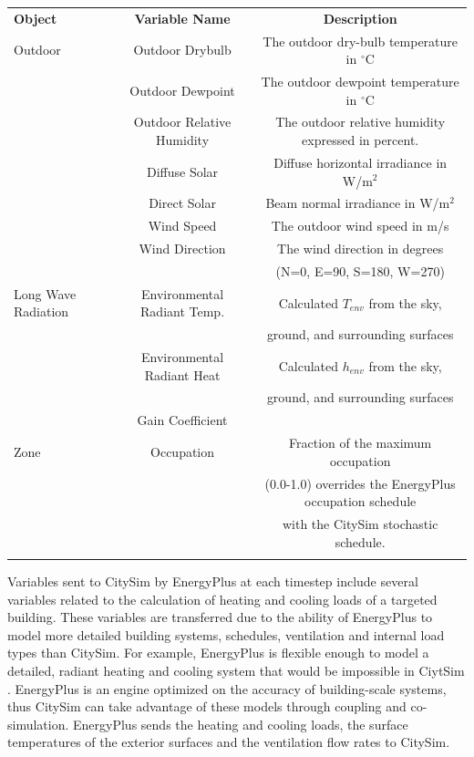 \documentclass{tBPS2e}
\theoremstyle{plain}
\theoremstyle{definition}
\theoremstyle{remark}
\begin{document}
\begin{table}[H]
{\begin{tabular}[l]{@{}lcc}\toprule
  \bf{Object} &  \bf{Variable Name} & \bf{Description} \\
\colrule
  Outdoor & Outdoor Drybulb & The outdoor dry-bulb temperature in $^{\circ}\mathrm{C}$ \\
 & Outdoor Dewpoint & The outdoor dewpoint temperature in $^{\circ}\mathrm{C}$ \\
 & Outdoor Relative Humidity & The outdoor relative humidity expressed in percent. \\
 & Diffuse Solar & Diffuse horizontal irradiance in W/m$^2$ \\
 & Direct Solar & Beam normal irradiance in W/m$^2$ \\
 & Wind Speed & The outdoor wind speed in m/s \\
 & Wind Direction & The wind direction in degrees\\&&  (N=0, E=90, S=180, W=270) \\
 \hline
 Long Wave Radiation & Environmental Radiant Temp. & Calculated $T_{env}$ from the sky,\\&& ground, and surrounding surfaces \\
 & Environmental Radiant Heat & Calculated $h_{env}$ from the sky,\\&& ground, and surrounding surfaces \\
 & Gain Coefficient \\
 \hline
Zone & Occupation & Fraction of the maximum occupation\\&& (0.0-1.0) overrides the EnergyPlus occupation schedule\\&&  with the CitySim stochastic schedule. \\
\botrule
\end{tabular}}
\label{FMUimports}
\end{table}

Variables sent to CitySim by EnergyPlus at each timestep include several variables related to the calculation of heating and cooling loads of a targeted building. These variables are transferred due to the ability of EnergyPlus to model more detailed building systems, schedules, ventilation and internal load types than CitySim. For example, EnergyPlus is flexible enough to model a detailed, radiant heating and cooling system that would be impossible in CiytSim \cite{barbara:2015tz}. EnergyPlus is an engine optimized on the accuracy of building-scale systems, thus CitySim can take advantage of these models through coupling and co-simulation. EnergyPlus sends the heating and cooling loads, the surface temperatures of the exterior surfaces and the ventilation flow rates to CitySim.
\end{document}
